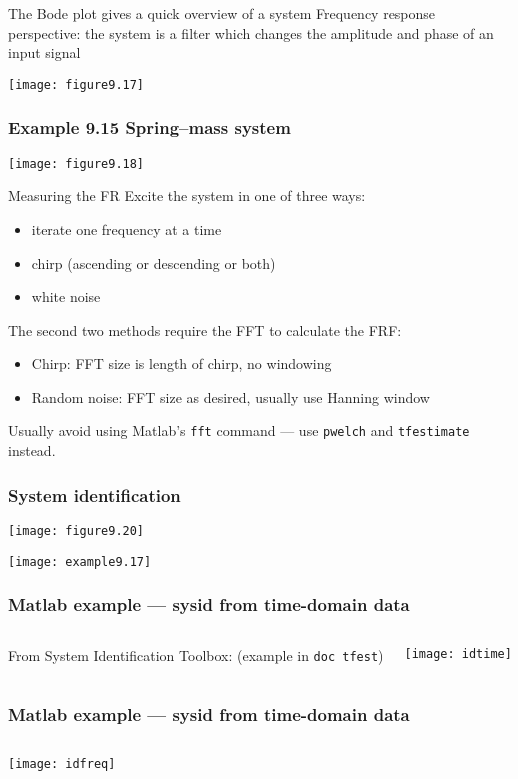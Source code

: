 \documentclass{beamer-control}
\begin{document}
\begin{frame}{The Bode plot gives a quick overview of a system}
Frequency response perspective: the system is a filter which changes the amplitude and phase of an input signal

\vfill
\centering
\texttt{[image: figure9.17]}

\end{frame}

\begin{frame}
\frametitle{Example 9.15 Spring--mass system}

\centering
\texttt{[image: figure9.18]}


\end{frame}



\begin{frame}{Measuring the FR}
Excite the system in one of three ways:
\begin{itemize}
\item iterate one frequency at a time
\item chirp (ascending or descending or both)
\item white noise
\end{itemize}
The second two methods require the FFT to calculate the FRF:
\begin{itemize}
\item Chirp: FFT size is length of chirp, no windowing
\item Random noise: FFT size as desired, usually use Hanning window
\end{itemize}
Usually avoid using Matlab's \texttt{fft} command --- use \texttt{pwelch} and \texttt{tfestimate} instead.
\end{frame}

\begin{frame}
\frametitle{System identification}
\centering

\texttt{[image: figure9.20]}

\hrulefill
\vfill

\texttt{[image: example9.17]}


\end{frame}

\begin{frame}
\frametitle{Matlab example --- sysid from time-domain data}

\begin{columns}
From System Identification Toolbox: (example in \texttt{doc tfest})

\texttt{[image: idtime]}

\end{columns}

\end{frame}

\begin{frame}
\frametitle{Matlab example --- sysid from time-domain data}
\small

\begin{columns}

\texttt{[image: idfreq]}
\end{columns}
\end{frame}

\SUMMARYFRAME
\FINALE
\end{document}
